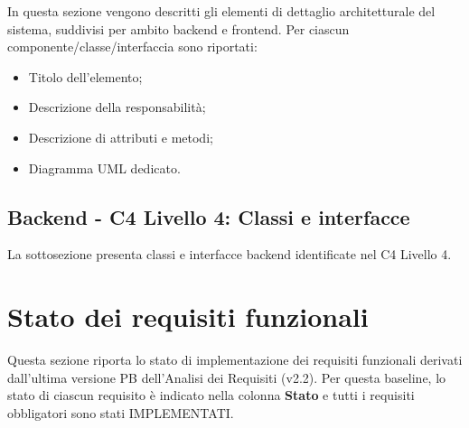 \documentclass[a4paper, 11pt, oneside]{scrartcl}
\begin{document}
In questa sezione vengono descritti gli elementi di dettaglio architetturale del sistema, suddivisi per ambito backend e frontend.
Per ciascun componente/classe/interfaccia sono riportati:
\begin{itemize}
    \item Titolo dell'elemento;
    \item Descrizione della responsabilità;
    \item Descrizione di attributi e metodi;
    \item Diagramma UML dedicato.
\end{itemize}

\subsection{Backend - C4 Livello 4: Classi e interfacce}
La sottosezione presenta classi e interfacce backend identificate nel C4 Livello 4.










\newpage
\section{Stato dei requisiti funzionali}

Questa sezione riporta lo stato di implementazione dei requisiti funzionali derivati dall'ultima versione PB dell'Analisi dei Requisiti (v2.2). Per questa baseline, lo stato di ciascun requisito è indicato nella colonna \textbf{Stato} e tutti i requisiti obbligatori sono stati IMPLEMENTATI.
\end{document}
